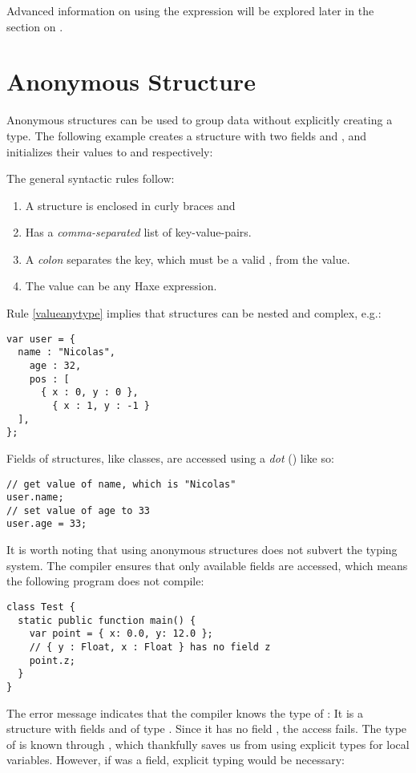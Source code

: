 Advanced information on using the  expression will be explored later in the section on .


\section{Anonymous Structure}
\label{types-anonymous-structure}

Anonymous structures can be used to group data without explicitly creating a type. The following example creates a structure with two fields  and , and initializes their values to  and  respectively:

The general syntactic rules follow:

\begin{enumerate}
	\item A structure is enclosed in curly braces \expr{$\left\{\right\}$} and
	\item Has a \emph{comma-separated} list of key-value-pairs.
	\item A \emph{colon} separates the key, which must be a valid , from the value.
	\item\label{valueanytype} The value can be any Haxe expression.
\end{enumerate}
Rule \ref{valueanytype} implies that structures can be nested and complex, e.g.:


\begin{lstlisting}
var user = {
  name : "Nicolas",
	age : 32,
	pos : [
	  { x : 0, y : 0 },
		{ x : 1, y : -1 }
  ],
};
\end{lstlisting}
Fields of structures, like classes, are accessed using a \emph{dot} () like so:

\begin{lstlisting}
// get value of name, which is "Nicolas"
user.name;
// set value of age to 33
user.age = 33;
\end{lstlisting}
It is worth noting that using anonymous structures does not subvert the typing system. The compiler ensures that only available fields are accessed, which means the following program does not compile:

\begin{lstlisting}
class Test {
  static public function main() {
    var point = { x: 0.0, y: 12.0 };
    // { y : Float, x : Float } has no field z
    point.z;
  }
}
\end{lstlisting}
The error message indicates that the compiler knows the type of : It is a structure with fields  and  of type . Since it has no field , the access fails.
The type of  is known through , which thankfully saves us from using explicit types for local variables. However, if  was a field, explicit typing would be necessary:

